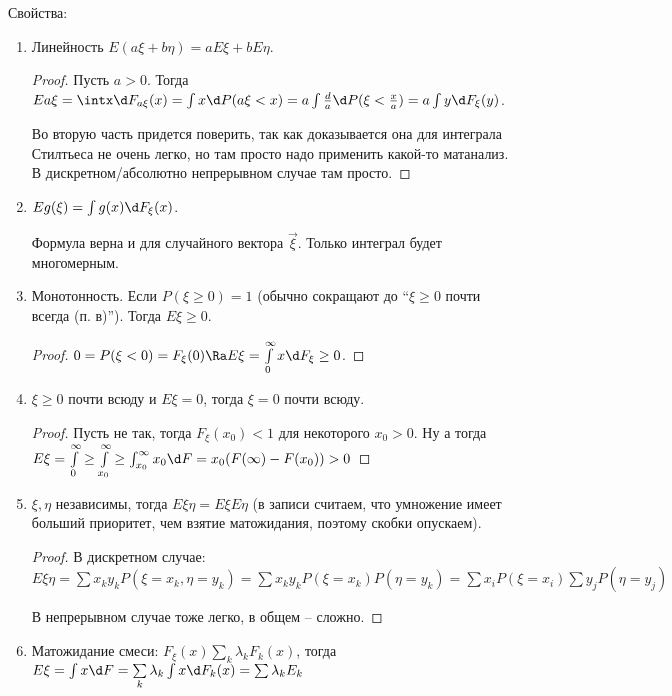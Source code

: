 Свойства:
\begin{enumerate}
\item Линейность $E(a\xi + b\eta) = aE\xi + bE\eta$.
\begin{proof}
Пусть $a > 0$. Тогда $Ea\xi = \intx \d F_{a\xi}(x) = \int x \d P(a\xi < x) = a \int \frac{d}{a} \d P(\xi < \frac{x}{a}) = a \int y \d F_\xi(y)$.

Во вторую часть придется поверить, так как доказывается она для интеграла Стилтьеса не очень легко, но там просто надо применить какой-то матанализ.
В дискретном/абсолютно непрерывном случае там просто.
\end{proof}
\item $Eg(\xi) = \int g(x) \d F_\xi(x)$.
\begin{Rem}
Формула верна и для случайного вектора $\vec{\xi}$. Только интеграл будет многомерным.
\end{Rem}

\item Монотонность. Если $P(\xi \geq 0) = 1$ (обычно сокращают до ``$\xi \geq 0$ почти всегда (п. в)''). Тогда $E\xi \geq 0$.
\begin{proof}
$0 = P(\xi < 0) = F_\xi(0) \Ra E\xi = \int\limits_0^{\infty}x \d F_\xi \geq 0$.
\end{proof}

\item $\xi \geq 0$ почти всюду и $E\xi = 0$, тогда $\xi = 0$ почти всюду.
\begin{proof}
Пусть не так, тогда $F_\xi(x_0) < 1$ для некоторого $x_0 > 0$. 
Ну а тогда $E\xi = \int\limits_0^{\infty} \geq \int\limits_{x_0}^\infty \geq  \int_{x_0}^\infty x_0 \d F = x_0 (F(\infty) - F(x_0)) > 0$
\end{proof}

\item $\xi, \eta$ независимы, тогда $E\xi\eta = E\xi E\eta$ (в записи считаем, что умножение имеет больший приоритет, чем взятие матожидания, поэтому скобки опускаем).
\begin{proof}
В дискретном случае: $E\xi\eta = \sum x_k y_k P(\xi = x_k, \eta = y_k) = \sum x_k y_k P(\xi = x_k) P(\eta = y_k) = \sum x_i P(\xi = x_i) \sum y_j P(\eta = y_j)$

В непрерывном случае тоже легко, в общем -- сложно.
\end{proof}

\item Матожидание смеси: $F_\xi(x) \sum\limits_k \lambda_kF_k(x)$, тогда $E\xi = \int x \d F = \sum\limits_k \lambda_k \int x \d F_k(x) = \sum \lambda_k E_k$
\end{enumerate}


